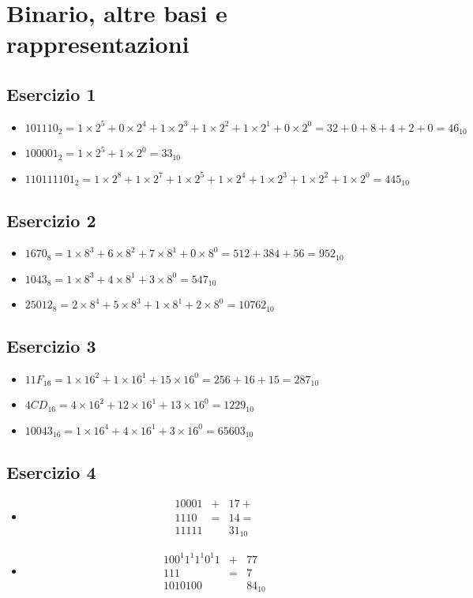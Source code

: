\documentclass{article}
\begin{document}
\section*{Binario, altre basi e rappresentazioni}
\subsection*{Esercizio 1}
\begin{itemize}
\item ${101110}_2 = 1\times2^5 + 0\times2^4 + 1\times2^3 + 1\times2^2 + 1\times2^1 + 0\times2^0 = 32 + 0 + 8 + 4 + 2 + 0 = 46_{10}$ 
\item ${100001}_2 = 1\times2^5 + 1\times2^0 = 33_{10}$
\item ${110111101}_2 = 1\times2^8 + 1\times2^7 + 1\times2^5 + 1\times2^4 + 1\times2^3 + 1\times2^2 + 1\times2^0 = 445_{10}$
\end{itemize}

\subsection*{Esercizio 2}
\begin{itemize}
\item ${1670}_8 = 1\times8^3 + 6\times8^2 + 7\times8^1 + 0\times8^0 =  512 + 384 + 56 = 952_{10}$
\item ${1043}_8 = 1\times8^3 + 4\times8^1 + 3\times8^0 = 547_{10}$
\item ${25012}_8 = 2\times8^4 + 5\times8^3 + 1\times8^1 + 2\times8^0 = 10762_{10}$
\end{itemize}

\subsection*{Esercizio 3}
\begin{itemize}
\item ${11F}_{16} = 1\times16^2 + 1\times16^1 + 15\times16^0 = 256 + 16 + 15 = 287_{10}$
\item ${4CD}_{16} = 4\times16^2 + 12\times16^1 + 13\times16^0 = 1229_{10}$
\item ${10043}_{16} = 1\times16^4 + 4\times16^1 + 3\times16^0 = 65603_{10}$
\end{itemize}

\subsection*{Esercizio 4}
\begin{itemize}
\item
\begin{align*}
10001&+  &17 +\\
 1110&=  &14 = \\
11111&  &31_{10}
\end{align*}
\item
\begin{align*}
100^1 1^1 1^1 0^1 1&+  &77\\
        111&=  &7\\
1010100&  &84_{10}
\end{align*}
\end{itemize}
\end{document}
